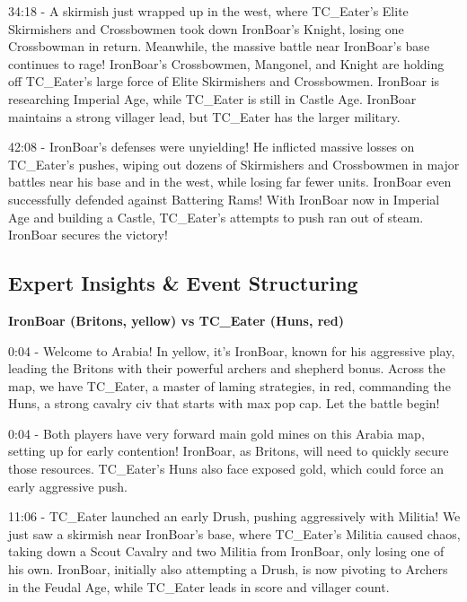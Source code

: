 34:18 - A skirmish just wrapped up in the west, where TC\_Eater's Elite Skirmishers and Crossbowmen took down IronBoar's Knight, losing one Crossbowman in return. Meanwhile, the massive battle near IronBoar's base continues to rage! IronBoar's Crossbowmen, Mangonel, and Knight are holding off TC\_Eater's large force of Elite Skirmishers and Crossbowmen. IronBoar is researching Imperial Age, while TC\_Eater is still in Castle Age. IronBoar maintains a strong villager lead, but TC\_Eater has the larger military. \par \vspace{1em}

42:08 - IronBoar's defenses were unyielding! He inflicted massive losses on TC\_Eater's pushes, wiping out dozens of Skirmishers and Crossbowmen in major battles near his base and in the west, while losing far fewer units. IronBoar even successfully defended against Battering Rams! With IronBoar now in Imperial Age and building a Castle, TC\_Eater's attempts to push ran out of steam. IronBoar secures the victory! \par \vspace{1em}

\subsection{Expert Insights \& Event Structuring}
\textbf{IronBoar (Britons, yellow) vs TC\_Eater (Huns, red)}

0:04 - Welcome to Arabia! In yellow, it's IronBoar, known for his aggressive play, leading the Britons with their powerful archers and shepherd bonus. Across the map, we have TC\_Eater, a master of laming strategies, in red, commanding the Huns, a strong cavalry civ that starts with max pop cap. Let the battle begin! \par \vspace{1em}

0:04 - Both players have very forward main gold mines on this Arabia map, setting up for early contention! IronBoar, as Britons, will need to quickly secure those resources. TC\_Eater's Huns also face exposed gold, which could force an early aggressive push. \par \vspace{1em}

11:06 - TC\_Eater launched an early Drush, pushing aggressively with Militia! We just saw a skirmish near IronBoar's base, where TC\_Eater’s Militia caused chaos, taking down a Scout Cavalry and two Militia from IronBoar, only losing one of his own. IronBoar, initially also attempting a Drush, is now pivoting to Archers in the Feudal Age, while TC\_Eater leads in score and villager count. \par \vspace{1em}

